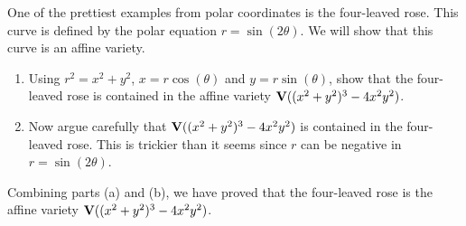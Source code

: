 \begin{exercise}{7}
One of the prettiest examples from polar coordinates is the four-leaved rose. This curve is defined by the polar equation $r=\sin(2\theta)$. We will show that this curve is an affine variety.
\begin{enumerate}
    \item Using $r^2 = x^2 + y^2$, $x=r\cos(\theta)$ and $y=r\sin(\theta)$, show that the four-leaved rose is contained in the affine variety $\mathbf{V}( (x^2 + y^2)^3 - 4x^2 y^2)$.
    \item Now argue carefully that $\mathbf{V}((x^2 + y^2)^3 - 4x^2 y^2)$ is contained in the four-leaved rose. This is trickier than it seems since $r$ can be negative in $r=\sin(2\theta)$.
\end{enumerate}
Combining parts (a) and (b), we have proved that the four-leaved rose is the affine variety $\mathbf{V}((x^2 + y^2)^3 - 4x^2 y^2)$.
\end{exercise}
